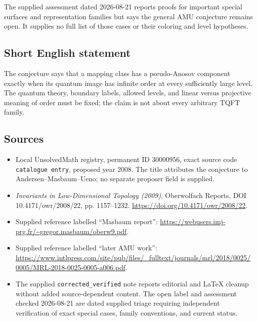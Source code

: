 \documentclass[11pt]{article}
\begin{document}
The supplied assessment dated 2026-08-21 reports proofs for important special surfaces and representation families but says the general AMU conjecture remains open. It supplies no full list of those cases or their coloring and level hypotheses.
\subsection{Short English statement}
The conjecture says that a mapping class has a pseudo-Anosov component exactly when its quantum image has infinite order at every sufficiently large level. The quantum theory, boundary labels, allowed levels, and linear versus projective meaning of order must be fixed; the claim is not about every arbitrary TQFT family.
\subsection{Sources}
\begin{itemize}
\item Local UnsolvedMath registry, permanent ID \(30000956\), exact source code \texttt{catalogue entry}, proposed year 2008. The title attributes the conjecture to Andersen--Masbaum--Ueno; no separate proposer field is supplied.
\item \emph{Invariants in Low-Dimensional Topology (2009)}, Oberwolfach Reports, DOI 10.4171/owr/2008/22, pp. 1157--1232. \url{https://doi.org/10.4171/owr/2008/22}.
\item Supplied reference labelled ``Masbaum report'': \url{https://webusers.imj-prg.fr/~gregor.masbaum/oberw9.pdf}.
\item Supplied reference labelled ``later AMU work'': \url{https://www.intlpress.com/site/pub/files/_fulltext/journals/mrl/2018/0025/0005/MRL-2018-0025-0005-a006.pdf}.
\item The supplied \texttt{corrected\_verified} note reports editorial and LaTeX cleanup without added source-dependent content. The open label and assessment checked 2026-08-21 are dated supplied triage requiring independent verification of exact special cases, family conventions, and current status.
\end{itemize}
\end{document}
